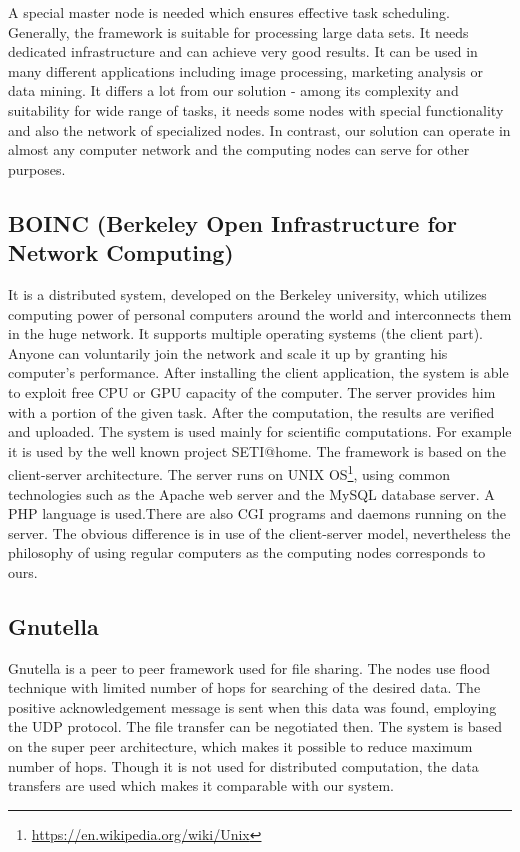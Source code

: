 A special master node is needed which ensures effective task scheduling.
Generally, the framework is suitable for processing large data sets. It
needs dedicated infrastructure and can achieve very good results. It can
be used in many different applications including image processing,
marketing analysis or data mining. It differs a lot from our solution -
among its complexity and suitability for wide range of tasks, it needs
some nodes with special functionality and also the network of
specialized nodes. In contrast, our solution can operate in almost any
computer network and the computing nodes can serve for other
purposes.\citep{Hadoop} \citep{MapRed}

\subsection{BOINC (Berkeley Open Infrastructure for Network
Computing)}\label{boinc-berkeley-open-infrastructure-for-network-computing}

It is a distributed system, developed on the Berkeley university, which
utilizes computing power of personal computers around the world and
interconnects them in the huge network. It supports multiple operating
systems (the client part). Anyone can voluntarily join the network and
scale it up by granting his computer's performance. After installing the
client application, the system is able to exploit free CPU or GPU
capacity of the computer. The server provides him with a portion of the
given task. After the computation, the results are verified and
uploaded. The system is used mainly for scientific computations. For
example it is used by the well known project SETI@home. The framework is
based on the client-server architecture. The server runs on UNIX
OS\footnote{\url{https://en.wikipedia.org/wiki/Unix}}, using common
technologies such as the Apache web server and the MySQL database
server. A PHP language is used.There are also CGI programs and daemons
running on the server. The obvious difference is in use of the
client-server model, nevertheless the philosophy of using regular
computers as the computing nodes corresponds to ours. \cite{BOINC}

\subsection{Gnutella}\label{gnutella}

Gnutella is a peer to peer framework used for file sharing. The nodes
use flood technique with limited number of hops for searching of the
desired data. The positive acknowledgement message is sent when this
data was found, employing the UDP protocol. The file transfer can be
negotiated then. The system is based on the super peer architecture,
which makes it possible to reduce maximum number of hops. Though it is
not used for distributed computation, the data transfers are used which
makes it comparable with our system.\citep{Gnutella}

